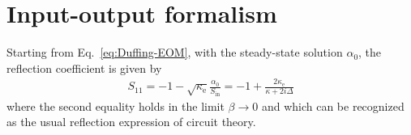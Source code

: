 
\section{Input-output formalism}\label{app:inputoutput}

Starting from Eq.~\eqref{eq:Duffing-EOM}, with the steady-state solution $\alpha_0$, the reflection coefficient is given by
% 
\begin{align}
S_{11}=-1-\sqrt{\kappa_\text{e}}\frac{\alpha_0}{S_\text{in}}=-1+\frac{2\kappa_\text{e}}{\kappa+2i\Delta}
\end{align}
% 
where the second equality holds in the limit $\beta\rightarrow 0$ and which can be recognized as the usual reflection expression of circuit theory.

